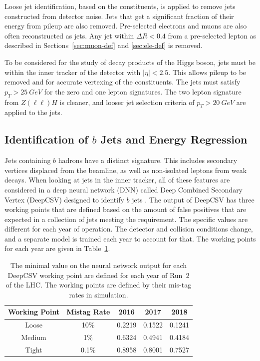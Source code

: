 Loose jet identification, based on the constituents,
is applied to remove jets constructed from detector noise.
Jets that get a significant fraction of their energy from pileup are also removed.
Pre-selected electrons and muons are also often reconstructed as jets.
Any jet within $\Delta R < 0.4$ from a pre-selected lepton as described in
Sections~\ref{sec:muon-def} and \ref{sec:ele-def} is removed.

To be considered for the study of decay products of the Higgs boson,
jets must be within the inner tracker of the detector with $|\eta| < 2.5$.
This allows pileup to be removed and for accurate vertexing of the constituents.
The jets must satisfy $p_T > \SI{25}{GeV}$ for the zero and one lepton signatures.
The two lepton signature from $Z(\ell\ell)H$ is cleaner,
and looser jet selection criteria of $p_T > \SI{20}{GeV}$ are applied to the jets.

\subsection{Identification of $b$ Jets and Energy Regression}

Jets containing $b$ hadrons have a distinct signature.
This includes secondary vertices displaced from the beamline,
as well as non-isolated leptons from weak decays.
When looking at jets in the inner tracker,
all of these features are considered in a deep neural network (DNN)
called Deep Combined Secondary Vertex (DeepCSV)
designed to identify $b$ jets \cite{Sirunyan_2018}.
The output of DeepCSV has three working points
that are defined based on the amount of false positives that are expected
in a collection of jets meeting the requirement.
The specific values are different for each year of operation.
The detector and collision conditions change,
and a separate model is trained each year to account for that.
The working points for each year are given in Table~\ref{tab:deepcsv}.
\begin{table}
  \centering
  \caption[DeepCSV working points]{
    The minimal value on the neural network output for each DeepCSV working point
    are defined for each year of Run~2 of the LHC.
    The working points are defined by their mis-tag rates in simulation.
  }
  {\renewcommand{\arraystretch}{1.5}
  \begin{tabular}{|c | c | c c c|}
    \hline
    Working Point & Mistag Rate & 2016 & 2017 & 2018 \\
    \hline
    Loose  &  10\% & 0.2219 & 0.1522 & 0.1241 \\
    Medium &   1\% & 0.6324 & 0.4941 & 0.4184 \\
    Tight  & 0.1\% & 0.8958 & 0.8001 & 0.7527 \\
    \hline
  \end{tabular}
  }
  \label{tab:deepcsv}
\end{table}

